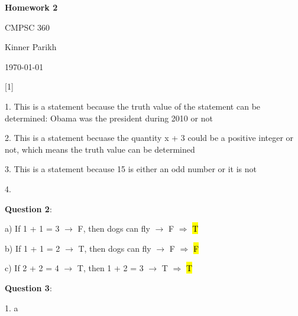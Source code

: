 \documentclass{article} %
\newcommand{\question}[2][]{\begin{flushleft}
        \textbf{Question #1}: \textit{#2}

\end{flushleft}}
\newcommand{\maketitletwo}[2][]{\begin{center}
        \Large{\textbf{Homework #1}
            
            CMPSC 360} %
        \vspace{5pt}
        
        \normalsize{Kinner Parikh  %
        
        \today}        %
        \vspace{15pt}
        
\end{center}}
\begin{document}
    \maketitletwo[2]  %
    
    \question[1]{}
    
    1. This is a statement because the truth value of the statement can be determined: Obama was the president during 2010 or not

    2. This is a statement becuase the quantity x + 3 could be a positive integer or not, which means the truth value can be determined

    3. This is a statement because 15 is either an odd number or it is not

    4. 

    \question[2]{}

    a) If 1 + 1 = 3 $\rightarrow$ F, then dogs can fly $\rightarrow$ F $\Rightarrow$  \hl{T}

    b) If 1 + 1 = 2 $\rightarrow$ T, then dogs can fly $\rightarrow$ F $\Rightarrow$  \hl{F}

    c) If 2 + 2 = 4 $\rightarrow$ T, then 1 + 2 = 3 $\rightarrow$ T $\Rightarrow$  \hl{T}

    \question[3]{}

    1. a
\end{document}
